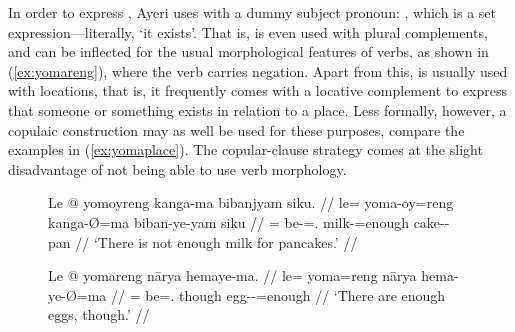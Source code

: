 In order to express , Ayeri uses  with a dummy
subject pronoun: , which is a set
expression---literally, `it exists'. That is,  is even
used with plural complements, and can be inflected for the usual morphological
features of verbs, as shown in (\ref{ex:yomareng}), where the verb carries
negation. Apart from this,  is usually used with locations,
that is, it frequently comes with a locative complement to express that someone
or something exists in relation to a place. Less formally, however, a copulaic
construction may as well be used for these purposes, compare the examples in
(\ref{ex:yomaplace}). The copular-clause strategy comes at the slight
disadvantage of not being able to use verb morphology.

\begin{figure}
\pex\label{ex:yomareng}
\a\label{ex:yomareng_sg}\begingl
	\gla Le @ yomoyreng kanga-ma bibanjyam siku. //
	\glb le= yoma-oy=reng kanga-Ø=ma biban-ye-yam siku //
	\glc \PatTI{}= be-\Neg{}=\TsgI{}.\Aarg{} milk-\Top{}=enough
		cake-\Pl{}-\Dat {} pan //
	\glft `There is not enough milk for pancakes.' //
\endgl

\a\label{ex:yomareng_pl}\begingl
	\gla Le @ yomareng nārya hemaye-ma. //
	\glb le= yoma=reng nārya hema-ye-Ø=ma //
	\glc \PatTI{}= be=\TsgI{}.\Aarg{} though egg-\Pl{}-\Top{}=enough //
	\glft `There are enough eggs, though.' //
\endgl
\xe
\end{figure}


